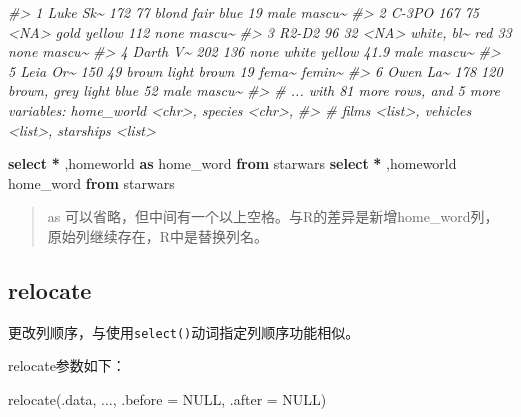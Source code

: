 \documentclass[
]{book}
\newenvironment{Shaded}{\begin{snugshade}}{\end{snugshade}}
\newcommand{\AttributeTok}[1]{\textcolor[rgb]{0.77,0.63,0.00}{#1}}
\newcommand{\CommentTok}[1]{\textcolor[rgb]{0.56,0.35,0.01}{\textit{#1}}}
\newcommand{\ConstantTok}[1]{\textcolor[rgb]{0.00,0.00,0.00}{#1}}
\newcommand{\FunctionTok}[1]{\textcolor[rgb]{0.00,0.00,0.00}{#1}}
\newcommand{\KeywordTok}[1]{\textcolor[rgb]{0.13,0.29,0.53}{\textbf{#1}}}
\newcommand{\NormalTok}[1]{#1}
\newcommand{\OperatorTok}[1]{\textcolor[rgb]{0.81,0.36,0.00}{\textbf{#1}}}
\begin{document}
\begin{Shaded}
\begin{Highlighting}[]
\CommentTok{\#\textgreater{} 1 Luke Sk\textasciitilde{}    172    77 blond       fair       blue            19   male  mascu\textasciitilde{}}
\CommentTok{\#\textgreater{} 2 C{-}3PO       167    75 \textless{}NA\textgreater{}        gold       yellow         112   none  mascu\textasciitilde{}}
\CommentTok{\#\textgreater{} 3 R2{-}D2        96    32 \textless{}NA\textgreater{}        white, bl\textasciitilde{} red             33   none  mascu\textasciitilde{}}
\CommentTok{\#\textgreater{} 4 Darth V\textasciitilde{}    202   136 none        white      yellow          41.9 male  mascu\textasciitilde{}}
\CommentTok{\#\textgreater{} 5 Leia Or\textasciitilde{}    150    49 brown       light      brown           19   fema\textasciitilde{} femin\textasciitilde{}}
\CommentTok{\#\textgreater{} 6 Owen La\textasciitilde{}    178   120 brown, grey light      blue            52   male  mascu\textasciitilde{}}
\CommentTok{\#\textgreater{} \# ... with 81 more rows, and 5 more variables: home\_world \textless{}chr\textgreater{}, species \textless{}chr\textgreater{},}
\CommentTok{\#\textgreater{} \#   films \textless{}list\textgreater{}, vehicles \textless{}list\textgreater{}, starships \textless{}list\textgreater{}}
\end{Highlighting}
\end{Shaded}

\begin{Shaded}
\begin{Highlighting}[]
\KeywordTok{select} \OperatorTok{*}\NormalTok{ ,homeworld }\KeywordTok{as}\NormalTok{ home\_word }\KeywordTok{from}\NormalTok{ starwars }
\KeywordTok{select} \OperatorTok{*}\NormalTok{ ,homeworld  home\_word }\KeywordTok{from}\NormalTok{ starwars }
\end{Highlighting}
\end{Shaded}

\begin{quote}
as 可以省略，但中间有一个以上空格。与R的差异是新增home\_word列，原始列继续存在，R中是替换列名。
\end{quote}

\hypertarget{dplyr-relocate}{%
\subsection{relocate}\label{dplyr-relocate}}

更改列顺序，与使用\texttt{select()}动词指定列顺序功能相似。

relocate参数如下：

\begin{Shaded}
\begin{Highlighting}[]
\FunctionTok{relocate}\NormalTok{(.data, ..., }\AttributeTok{.before =} \ConstantTok{NULL}\NormalTok{, }\AttributeTok{.after =} \ConstantTok{NULL}\NormalTok{)}
\end{Highlighting}
\end{Shaded}
\end{document}
